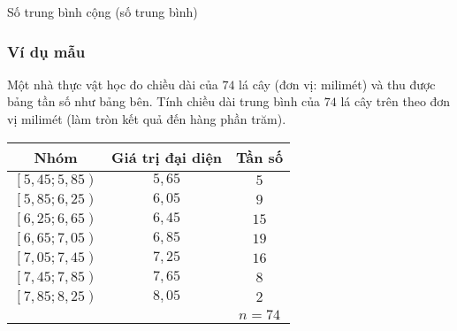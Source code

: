 \setcounter{subsubsection}{0}
\setcounter{ex}{0}
\setcounter{bt}{0}
\begin{dang}{Số trung bình cộng (số trung bình)}
\end{dang}
\subsubsection{Ví dụ mẫu}
\begin{vd}%
	\immini
	{
		Một nhà thực vật học đo chiều dài của $74$ lá cây (đơn vị: milimét) và thu được bảng tần số như bảng bên. Tính chiều dài trung bình của $74$ lá cây trên theo đơn vị milimét (làm tròn kết quả đến hàng phần trăm).
	}
	{
		\begin{tabular}{|c|c|c|}
			\hline
			\textbf{Nhóm} & \textbf{Giá trị đại diện} & \textbf{Tần số}\\ 
			\hline
			$\left[5{,}45;5{,}85\right)$ & $5{,}65$ & $5$\\
			$\left[5{,}85;6{,}25\right)$ & $6{,}05$ & $9$\\
			$\left[6{,}25;6{,}65\right)$ & $6{,}45$ & $15$\\
			$\left[6{,}65;7{,}05\right)$ & $6{,}85$ & $19$\\
			$\left[7{,}05;7{,}45\right)$ & $7{,}25$ & $16$\\
			$\left[7{,}45;7{,}85\right)$ & $7{,}65$ & $8$\\
			$\left[7{,}85;8{,}25\right)$ & $8{,}05$ & $2$\\
			\hline
			&  & $n = 74$\\
			\hline
		\end{tabular}
	}
\end{vd}
